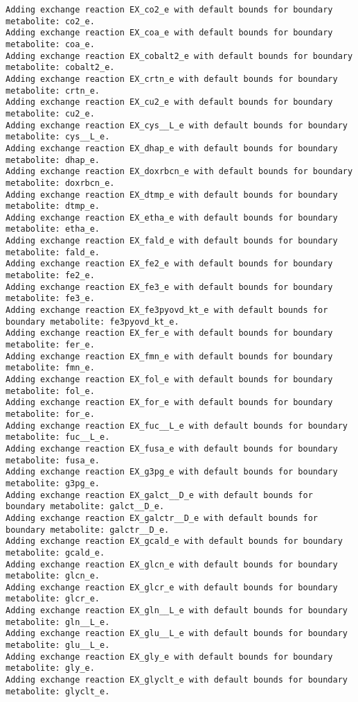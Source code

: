 \documentclass[
  letterpaper,
  DIV=11,
  numbers=noendperiod]{scrartcl}
\begin{document}
\begin{verbatim}
Adding exchange reaction EX_co2_e with default bounds for boundary metabolite: co2_e.
Adding exchange reaction EX_coa_e with default bounds for boundary metabolite: coa_e.
Adding exchange reaction EX_cobalt2_e with default bounds for boundary metabolite: cobalt2_e.
Adding exchange reaction EX_crtn_e with default bounds for boundary metabolite: crtn_e.
Adding exchange reaction EX_cu2_e with default bounds for boundary metabolite: cu2_e.
Adding exchange reaction EX_cys__L_e with default bounds for boundary metabolite: cys__L_e.
Adding exchange reaction EX_dhap_e with default bounds for boundary metabolite: dhap_e.
Adding exchange reaction EX_doxrbcn_e with default bounds for boundary metabolite: doxrbcn_e.
Adding exchange reaction EX_dtmp_e with default bounds for boundary metabolite: dtmp_e.
Adding exchange reaction EX_etha_e with default bounds for boundary metabolite: etha_e.
Adding exchange reaction EX_fald_e with default bounds for boundary metabolite: fald_e.
Adding exchange reaction EX_fe2_e with default bounds for boundary metabolite: fe2_e.
Adding exchange reaction EX_fe3_e with default bounds for boundary metabolite: fe3_e.
Adding exchange reaction EX_fe3pyovd_kt_e with default bounds for boundary metabolite: fe3pyovd_kt_e.
Adding exchange reaction EX_fer_e with default bounds for boundary metabolite: fer_e.
Adding exchange reaction EX_fmn_e with default bounds for boundary metabolite: fmn_e.
Adding exchange reaction EX_fol_e with default bounds for boundary metabolite: fol_e.
Adding exchange reaction EX_for_e with default bounds for boundary metabolite: for_e.
Adding exchange reaction EX_fuc__L_e with default bounds for boundary metabolite: fuc__L_e.
Adding exchange reaction EX_fusa_e with default bounds for boundary metabolite: fusa_e.
Adding exchange reaction EX_g3pg_e with default bounds for boundary metabolite: g3pg_e.
Adding exchange reaction EX_galct__D_e with default bounds for boundary metabolite: galct__D_e.
Adding exchange reaction EX_galctr__D_e with default bounds for boundary metabolite: galctr__D_e.
Adding exchange reaction EX_gcald_e with default bounds for boundary metabolite: gcald_e.
Adding exchange reaction EX_glcn_e with default bounds for boundary metabolite: glcn_e.
Adding exchange reaction EX_glcr_e with default bounds for boundary metabolite: glcr_e.
Adding exchange reaction EX_gln__L_e with default bounds for boundary metabolite: gln__L_e.
Adding exchange reaction EX_glu__L_e with default bounds for boundary metabolite: glu__L_e.
Adding exchange reaction EX_gly_e with default bounds for boundary metabolite: gly_e.
Adding exchange reaction EX_glyclt_e with default bounds for boundary metabolite: glyclt_e.

\end{verbatim}
\end{document}
